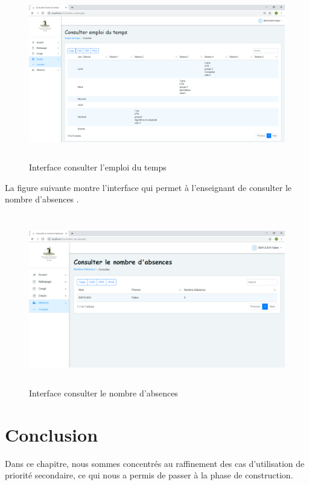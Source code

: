 \documentclass[12 pt ]{report}
\begin{document}
\begin{figure}[h]
 \begin{center}
\includegraphics[width= 18 cm ,height=  7.5cm]{consulter_emploi.PNG}
\caption{Interface consulter l'emploi du temps }

\end{center}
\end{figure}
La figure suivante montre l'interface qui permet à l'enseignant de consulter le nombre d'absences .
\begin{figure}[h]
 \begin{center}
\includegraphics[width= 18 cm ,height=  7.5cm]{consulter_nbr_abs.PNG}
\caption{Interface consulter le nombre d'absences }

\end{center}
\end{figure}
\section*{Conclusion}  
Dans ce chapitre, nous sommes concentrés au raffinement des cas d'utilisation de priorité secondaire, ce qui nous a permis de passer à la phase de construction.
\end{document}
